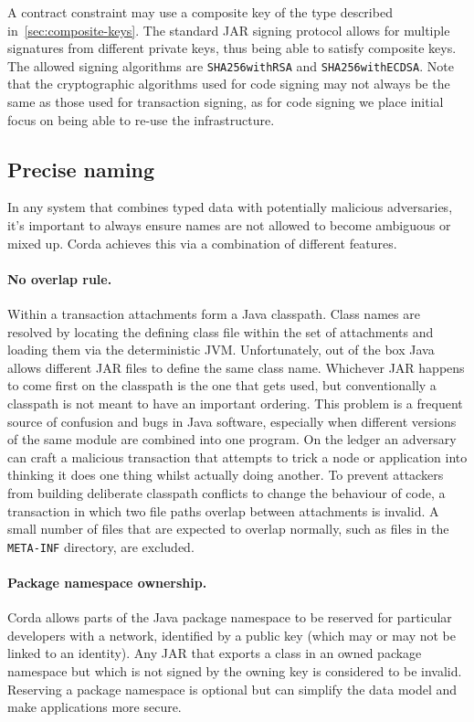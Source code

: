 \documentclass{article}
\begin{document}
A contract constraint may use a composite key of the type described in~\cref{sec:composite-keys}. The standard JAR
signing protocol allows for multiple signatures from different private keys, thus being able to satisfy composite
keys. The allowed signing algorithms are \texttt{SHA256withRSA} and \texttt{SHA256withECDSA}. Note that the
cryptographic algorithms used for code signing may not always be the same as those used for transaction signing, as
for code signing we place initial focus on being able to re-use the infrastructure.

\subsection{Precise naming}\label{subsec:precise-naming}

In any system that combines typed data with potentially malicious adversaries, it's important to always ensure
names are not allowed to become ambiguous or mixed up. Corda achieves this via a combination of different features.

\paragraph{No overlap rule.} Within a transaction attachments form a Java classpath. Class names are resolved by
locating the defining class file within the set of attachments and loading them via the deterministic JVM.
Unfortunately, out of the box Java allows different JAR files to define the same class name. Whichever JAR happens
to come first on the classpath is the one that gets used, but conventionally a classpath is not meant to have an
important ordering. This problem is a frequent source of confusion and bugs in Java software, especially when
different versions of the same module are combined into one program. On the ledger an adversary can craft a
malicious transaction that attempts to trick a node or application into thinking it does one thing whilst actually
doing another. To prevent attackers from building deliberate classpath conflicts to change the behaviour of code, a
transaction in which two file paths overlap between attachments is invalid. A small number of files that are
expected to overlap normally, such as files in the \texttt{META-INF} directory, are excluded.

\paragraph{Package namespace ownership.} Corda allows parts of the Java package namespace to be reserved for
particular developers with a network, identified by a public key (which may or may not be linked to an identity). Any JAR
that exports a class in an owned package namespace but which is not signed by the owning key is considered to be
invalid. Reserving a package namespace is optional but can simplify the data model and make applications more
secure.
\end{document}
